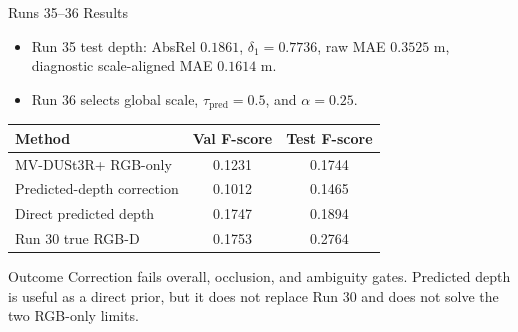 \begin{frame}{Runs 35--36 Results}
  \footnotesize
  \begin{itemize}
    \item Run 35 test depth: AbsRel \(0.1861\), \(\delta_1=0.7736\), raw MAE
    \(0.3525\) m, diagnostic scale-aligned MAE \(0.1614\) m.
    \item Run 36 selects global scale, \(\tau_{\mathrm{pred}}=0.5\), and
    \(\alpha=0.25\).
  \end{itemize}

  \begin{center}
    \begin{tabular}{lcc}
      \toprule
      Method & Val F-score & Test F-score \\
      \midrule
      MV-DUSt3R+ RGB-only & 0.1231 & 0.1744 \\
      Predicted-depth correction & 0.1012 & 0.1465 \\
      Direct predicted depth & 0.1747 & 0.1894 \\
      Run 30 true RGB-D & 0.1753 & 0.2764 \\
      \bottomrule
    \end{tabular}
  \end{center}

  \begin{alertblock}{Outcome}
    Correction fails overall, occlusion, and ambiguity gates. Predicted depth
    is useful as a direct prior, but it does not replace Run 30 and does not
    solve the two RGB-only limits.
  \end{alertblock}
\end{frame}

